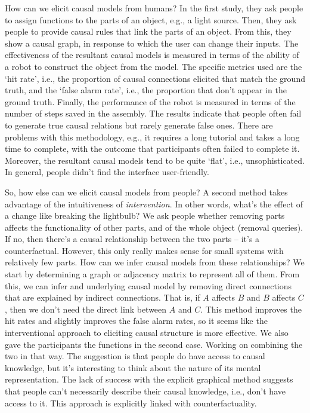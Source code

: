 \begin{affils}
\end{affils}

How can we elicit causal models from humans?
In the first study, they ask people to assign functions to the parts of an object,
e.g., a light source.
Then, they ask people to provide causal rules that link the parts of an object.
From this, they show a causal graph, in response to which the user can change their
inputs.
The effectiveness of the resultant causal models is measured in terms of the ability of
a robot to construct the object from the model.
The specific metrics used are the `hit rate', i.e., the proportion of causal
connections elicited that match the ground truth, and the `false alarm rate', i.e., the
proportion that don't appear in the ground truth.
Finally, the performance of the robot is measured in terms of the number of steps saved
in the assembly.
The results indicate that people often fail to generate true causal relations but
rarely generate false ones.
There are problems with this methodology, e.g., it requires a long tutorial and takes a
long time to complete, with the outcome that participants often failed to complete it.
Moreover, the resultant causal models tend to be quite `flat', i.e., unsophisticated.
In general, people didn't find the interface user-friendly.

So, how else can we elicit causal models from people?
A second method takes advantage of the intuitiveness of \emph{intervention}.
In other words, what's the effect of a change like breaking the lightbulb?
We ask people whether removing parts affects the functionality of other parts, and of
the whole object (removal queries).
If no, then there's a causal relationship between the two parts -- it's a
counterfactual.
However, this only really makes sense for small systems with relatively few parts.
How can we infer causal models from these relationships?
We start by determining a graph or adjacency matrix to represent all of them.
From this, we can infer and underlying causal model by removing direct connections that
are explained by indirect connections.
That is, if $A$ affects $B$ and $B$ affects $C$, then we don't need the direct link
between $A$ and $C$.
This method improves the hit rates and slightly improves the false alarm rates, so it
seems like the interventional approach to eliciting causal structure is more effective.
We also gave the participants the functions in the second case.
Working on combining the two in that way.
The suggestion is that people do have access to causal knowledge, but it's interesting
to think about the nature of its mental representation.
The lack of success with the explicit graphical method suggests that people can't
necessarily describe their causal knowledge, i.e., don't have access to it.
This approach is explicitly linked with counterfactuality.

